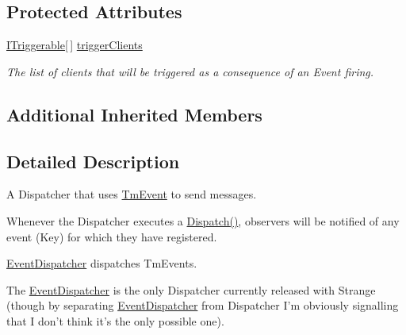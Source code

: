 \subsection*{Protected Attributes}
\begin{DoxyCompactItemize}
\item 
\hypertarget{classstrange_1_1extensions_1_1dispatcher_1_1eventdispatcher_1_1impl_1_1_event_dispatcher_a04a125caaca5a1e6b2f81924df9480f1}{\hyperlink{interfacestrange_1_1extensions_1_1dispatcher_1_1api_1_1_i_triggerable}{I\-Triggerable}\mbox{[}$\,$\mbox{]} \hyperlink{classstrange_1_1extensions_1_1dispatcher_1_1eventdispatcher_1_1impl_1_1_event_dispatcher_a04a125caaca5a1e6b2f81924df9480f1}{trigger\-Clients}}\label{classstrange_1_1extensions_1_1dispatcher_1_1eventdispatcher_1_1impl_1_1_event_dispatcher_a04a125caaca5a1e6b2f81924df9480f1}

\begin{DoxyCompactList}\small\item\em The list of clients that will be triggered as a consequence of an Event firing. \end{DoxyCompactList}\end{DoxyCompactItemize}
\subsection*{Additional Inherited Members}


\subsection{Detailed Description}
A Dispatcher that uses \hyperlink{classstrange_1_1extensions_1_1dispatcher_1_1eventdispatcher_1_1impl_1_1_tm_event}{Tm\-Event} to send messages. 

Whenever the Dispatcher executes a {\ttfamily \hyperlink{classstrange_1_1extensions_1_1dispatcher_1_1eventdispatcher_1_1impl_1_1_event_dispatcher_a70d8d7740798e10f960c866e03c4639b}{Dispatch()}}, observers will be notified of any event (Key) for which they have registered.

\hyperlink{classstrange_1_1extensions_1_1dispatcher_1_1eventdispatcher_1_1impl_1_1_event_dispatcher}{Event\-Dispatcher} dispatches Tm\-Events.

The \hyperlink{classstrange_1_1extensions_1_1dispatcher_1_1eventdispatcher_1_1impl_1_1_event_dispatcher}{Event\-Dispatcher} is the only Dispatcher currently released with Strange (though by separating \hyperlink{classstrange_1_1extensions_1_1dispatcher_1_1eventdispatcher_1_1impl_1_1_event_dispatcher}{Event\-Dispatcher} from Dispatcher I'm obviously signalling that I don't think it's the only possible one).

